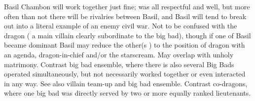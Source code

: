 \documentclass[12pt]{book}
\begin{document}
Basil Chambon will work together just fine; was all respectful and well, but more often than not there will be rivalries between Basil, and Basil will tend to break out into a literal example of an enemy civil war. Not to be confused with the dragon ( a main villain clearly subordinate to the big bad), though if one of Basil became dominant Basil may reduce the other(s ) to the position of dragon with an agenda, dragon-in-chief and/or the starscream. May overlap with unholy matrimony. Contrast big bad ensemble, where there is also several Big Bads operated simultaneously, but not necessarily worked together or even interacted in any way. See also villain team-up and big bad ensemble. Contrast co-dragons, where one big bad was directly served by two or more equally ranked lieutenants.
\end{document}
